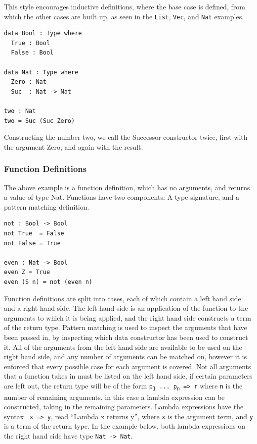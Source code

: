 \documentclass[a4paper]{article}
\begin{document}
This style encourages inductive definitions, where the base case is 
defined, from which the other cases are built up, as seen in the \texttt{List},
\texttt{Vec}, and \texttt{Nat} examples.

\begin{center}
\begin{verbatim}
data Bool : Type where
  True : Bool
  False : Bool

data Nat : Type where
  Zero : Nat
  Suc  : Nat -> Nat

two : Nat
two = Suc (Suc Zero)
\end{verbatim}
\end{center}

Constructing the number two, we call the Successor constructor twice, first with the argument Zero,
and again with the result.

\subsubsection{Function Definitions}
\label{sec:org19c74b8}
The above example is a function definition, which has no arguments,
and returns a value of type Nat. Functions have two components: 
A type signature, and a pattern matching definition.

\begin{center}
\begin{verbatim}
not : Bool -> Bool
not True  = False
not False = True

even : Nat -> Bool
even Z = True
even (S n) = not (even n) 
\end{verbatim}
\end{center}

Function definitions are split into cases, each of which contain 
a left hand side and a right hand side.
The left hand side is an application of the function to the arguments
to which it is being applied, and the right hand side constructs a term
of the return type. Pattern matching is used to inspect the arguments
that have been passed in, by inspecting which data constructor has been
used to construct it. All of the arguments from the left hand side are
available to be used on the right hand side, and any number of arguments
can be matched on, however it is enforced that every possible case for 
each argument is covered. Not all arguments that a function takes in 
must be listed on the left hand side, if certain parameters are left out,
the return type will be of the form \texttt{p\textsubscript{1} ... p\textsubscript{n} => r} where \texttt{n} is the 
number of remaining arguments, in this case a lambda expression can be 
constructed, taking in the remaining parameters. 
Lambda expressions have the syntax \texttt{\ x => y}, read ``Lambda x
returns y'', where \texttt{x} is the argument term, and \texttt{y} is a term of the
return type. In the example below, both lambda expressions on the right
hand side have type \texttt{Nat -> Nat}.
\end{document}
